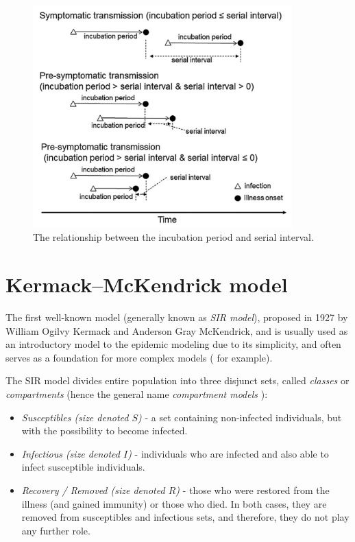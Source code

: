 \documentclass[
  digital, %
  oneside, %
  lof,     %
  lot,     %
]{fithesis4}
\begin{document}
\begin{figure}[h]
  \includegraphics[width=10cm]{static/images/nishiura2020_terms.png}
  \caption{The relationship between the incubation period and serial interval. \cite{nishiura2020}}
  \label{fig:nishiura-transmission}
\end{figure}


\section{Kermack–McKendrick model}

The first well-known model (generally 
known as \textit{SIR model}), proposed in 1927 by 
William Ogilvy Kermack and Anderson Gray McKendrick, and is 
usually used as an introductory model to the epidemic 
modeling \cite{martcheva2015} due to its simplicity, and
often serves as a foundation for more complex 
models (\cite{clancy2008} for example).

The SIR model divides entire population into three disjunct 
sets, called \textit{classes} or \textit{compartments} (hence the general 
name \textit{compartment models} \cite{bacaer2011}):

\begin{itemize}
  \item \textit{Susceptibles (size denoted $S$)} - a set containing non-infected individuals, but with the possibility to become infected.
  \item \textit{Infectious (size denoted $I$)} - individuals who are infected and also able to infect susceptible individuals.
  \item \textit{Recovery / Removed (size denoted $R$)} - those who were restored from the illness (and gained immunity) or those who died. In both cases, they are removed from susceptibles and infectious sets, and therefore, they do not play any further role.
\end{itemize}
\end{document}

